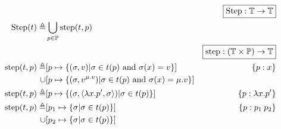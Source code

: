 \documentclass{article}
\begin{document}
\begin{align*}
                             &                                                                                                                                                                                                       & \fbox{$\Step:\mathbb{T}\rightarrow\mathbb{T}$}                   \\
  \Step(\ptree)   \triangleq & \bigcup_{p\in\mathbb{P}}\step(\ptree,p)                                                                                                                                                                                                                                  \\
                             &                                                                                                                                                                                                       & \fbox{$\step:(\mathbb{T}\times\mathbb{P})\rightarrow\mathbb{T}$} \\
  \step(\ptree,p) \triangleq & [p\mapsto\{(\ctx,v)|\ctx\in \ptree(p)\text{ and }\ctx(x)=v\}]                                                                                                                                         & \plabel{p}{x}                                                    \\
  \cup                       & [p\mapsto\{(\ctx,\openloc{\mu.v}{v})|\ctx\in \ptree(p)\text{ and }\ctx(x)=\mu.v\}]                                                                                                                                                                                       \\
  \step(\ptree,p) \triangleq & [p\mapsto\{(\ctx,\langle\lambda x.p',\ctx\rangle)|\ctx\in \ptree(p)\}]                                                                                                                                & \plabel{p}{\lambda x.p'}                                         \\
  \step(\ptree,p) \triangleq & [p_1\mapsto\{\ctx|\ctx\in \ptree(p)\}]                                                                                                                                                                & \plabel{p}{p_1\:p_2}                                             \\
  \cup                       & [p_2\mapsto\{\ctx|\ctx\in \ptree(p)\}]                                                                                                                                                                                                                                   \\

\end{align*}
\end{document}
